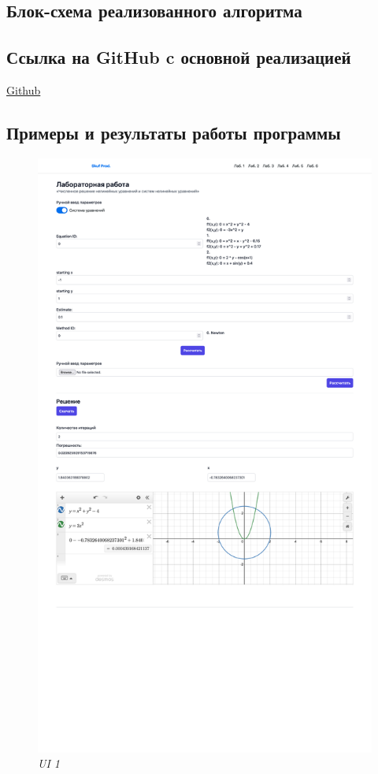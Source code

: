 \documentclass{article}
\begin{document}
      \subsection{Блок-схема реализованного алгоритма}
      \subsection{Ссылка на GitHub c основной реализацией}
            \href{https://github.com/isofinly/compmath}{Github}

      \subsection{Примеры и результаты работы программы}
            \begin{figure}[H] 
                  \begin{center}  
                        \includegraphics[scale=0.1]{SS1.png}
                        \caption{\small \sl UI 1}  
                  \end{center}  
            \end{figure}
\end{document}
